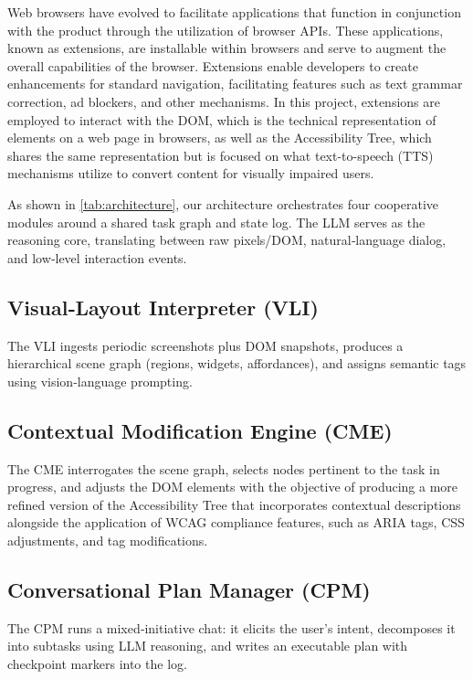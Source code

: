 \documentclass[conference]{IEEEtran}
\begin{document}
Web browsers have evolved to facilitate applications that function in conjunction with the product through the utilization of browser APIs. These applications, known as extensions, are installable within browsers and serve to augment the overall capabilities of the browser. Extensions enable developers to create enhancements for standard navigation, facilitating features such as text grammar correction, ad blockers, and other mechanisms. In this project, extensions are employed to interact with the DOM, which is the technical representation of elements on a web page in browsers, as well as the Accessibility Tree, which shares the same representation but is focused on what text-to-speech (TTS) mechanisms utilize to convert content for visually impaired users.

As shown in \autoref{tab:architecture}, our architecture orchestrates four cooperative modules around a shared task graph and state log. The LLM serves as the reasoning core, translating between raw pixels/DOM, natural‑language dialog, and low‑level interaction events.

\subsection{Visual‑Layout Interpreter (VLI)}
The VLI ingests periodic screenshots plus DOM snapshots, produces a hierarchical scene graph (regions, widgets, affordances), and assigns semantic tags using vision‑language prompting.

\subsection{Contextual Modification Engine (CME)}

The CME interrogates the scene graph, selects nodes pertinent to the task in progress, and adjusts the DOM elements with the objective of producing a more refined version of the Accessibility Tree that incorporates contextual descriptions alongside the application of WCAG compliance features, such as ARIA tags, CSS adjustments, and tag modifications.

\subsection{Conversational Plan Manager (CPM)}

The CPM runs a mixed‑initiative chat: it elicits the user's intent, decomposes it into subtasks using LLM reasoning, and writes an executable plan with checkpoint markers into the log.
\end{document}
